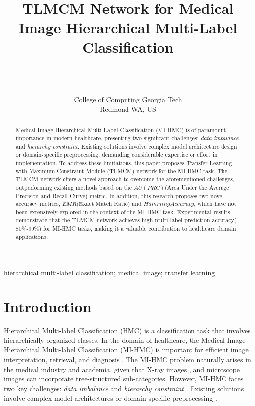 \documentclass[wcp]{jmlr}
\title[Short Title]{TLMCM Network for Medical Image Hierarchical Multi-Label Classification}
\author{\Name{Meng Wu$^*$} \Email{mwu344@gatech.edu}\\
  \Name{Siyan Luo$^*$} \Email{sluo96@gatech.edu}\\
  \Name{Qiyu Wu$^*$} \Email{qwu346@gatech.edu}\\
  \addr College of Computing Georgia Tech
  \AND
  \Name{Wenbin Ouyang} \Email{wenbinoy@gmail.com}\\
  \addr Redmond WA, US 
  }
\begin{document}
\maketitle
\def\thefootnote{*}

\begin{abstract}
    Medical Image Hierarchical Multi-Label Classification (MI-HMC) is of paramount importance in modern healthcare, presenting two significant challenges: \textit{data imbalance} and \textit{hierarchy constraint}. Existing solutions involve complex model architecture design or domain-specific preprocessing, demanding considerable expertise or effort in implementation. To address these limitations, this paper proposes Transfer Learning with Maximum Constraint Module (TLMCM) network for the MI-HMC task. The TLMCM network offers a novel approach to overcome the aforementioned challenges, outperforming existing methods based on the $AU\overline{(PRC)}$(Area Under the Average Precision and Recall Curve) metric. In addition, this research proposes two novel accuracy metrics, $EMR$(Exact Match Ratio) and $HammingAccuracy$, which have not been extensively explored in the context of the MI-HMC task. Experimental results demonstrate that the TLMCM network achieves high multi-label prediction accuracy($80\%$-$90\%$) for MI-HMC tasks, making it a valuable contribution to healthcare domain applications. 
\end{abstract}
\begin{keywords}
hierarchical multi-label classification; medical image; transfer learning
\end{keywords}

\section{Introduction}

Hierarchical Multi-label Classification (HMC) is a classification task that involves hierarchically organized classes. In the domain of healthcare, the Medical Image Hierarchical Multi-label Classification (MI-HMC) is important for efficient image interpretation, retrieval, and diagnosis \cite{Cai01,Kim01}. The MI-HMC problem naturally arises in the medical industry and academia, given that X-ray images \cite{Chen01}, and microscope images \cite{Dimitrovski01} can incorporate tree-structured sub-categories. However, MI-HMC faces two key challenges: \textit{data imbalance} and  \textit{hierarchy constraint} \cite{Giunchiglia01}. Existing solutions involve complex model architectures \cite{Wehrmann01,Noor01} or domain-specific preprocessing \cite{Dimitrovski02,Quan01,pelka18}. %
\end{document}
